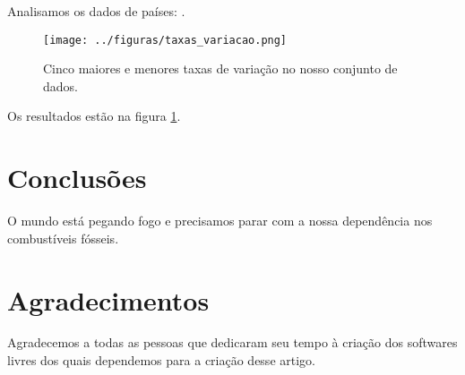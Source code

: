 \documentclass[twocolumn,A4]{article}
\begin{document}
Analisamos os dados de \NPaises{} países: \Paises{}.

\begin{figure}[htb]
    \centering
    \texttt{[image: ../figuras/taxas\_variacao.png]}
    \caption{
        Cinco maiores e menores taxas de variação no nosso conjunto de dados.
    }
    \label{fig:variacao}
\end{figure}

Os resultados estão na figura \ref{fig:variacao}.

\section{Conclusões}

O mundo está pegando fogo e precisamos parar com a nossa dependência nos
combustíveis fósseis.

\section*{Agradecimentos}

Agradecemos a todas as pessoas que dedicaram seu tempo à criação dos softwares
livres dos quais dependemos para a criação desse artigo.



\end{document}
